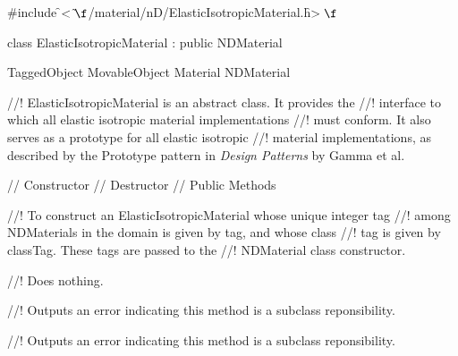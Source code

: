 
\indent \#include \f$<\tilde{ }\f$/material/nD/ElasticIsotropicMaterial.h\f$>\f$

\indent class ElasticIsotropicMaterial : public NDMaterial

\indent TaggedObject
\indent MovableObject
\indent\indent Material
\indent\indent\indent NDMaterial
\indent\indent\indent{}

//! ElasticIsotropicMaterial is an abstract class.  It provides the
//! interface to which all elastic isotropic material implementations
//! must conform.  It also serves as a prototype for all elastic isotropic
//! material implementations, as described by the Prototype pattern in
{\em Design Patterns} by Gamma et al.

\indent // Constructor
\indent // Destructor
\indent // Public Methods

//! To construct an ElasticIsotropicMaterial whose unique integer tag
//! among NDMaterials in the domain is given by \p tag, and whose class
//! tag is given by \p classTag.  These tags are passed to the
//! NDMaterial class constructor.

//! Does nothing. 

//! Outputs an error indicating this method is a subclass reponsibility.

//! Outputs an error indicating this method is a subclass reponsibility.

